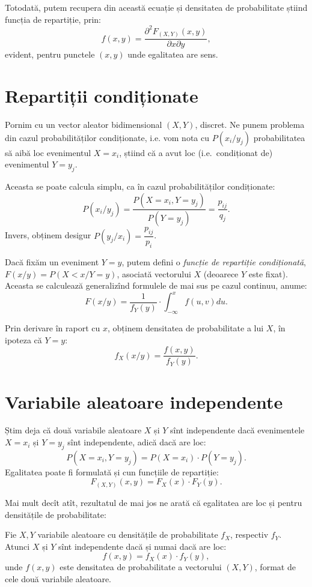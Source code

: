 Totodată, putem recupera din această ecuație și densitatea de probabilitate
știind funcția de repartiție, prin:
\[
  f(x, y) = \dfrac{\partial^2 F_{(X, Y)}(x, y)}{\partial x \partial y},
\]
evident, pentru punctele $ (x, y) $ unde egalitatea are sens.

\section{Repartiții condiționate}

Pornim cu un vector aleator bidimensional $ (X, Y) $, discret.
Ne punem problema din cazul probabilităților condiționate, i.e. vom nota
cu $ P(x_i/y_j) $ probabilitatea să aibă loc evenimentul $ X = x_i $,
știind că a avut loc (i.e.\ condiționat de) evenimentul $ Y = y_j $.

Aceasta se poate calcula simplu, ca în cazul probabilităților condiționate:
\[
  P(x_i / y_j) = \dfrac{P(X = x_i, Y = y_j)}{P(Y = y_j)} = \dfrac{p_{ij}}{q_j}.
\]
Invers, obținem desigur $ P(y_j / x_i) = \dfrac{p_{ij}}{p_i} $.

Dacă fixăm un eveniment $ Y = y $, putem defini o \emph{funcție de repartiție %
  condiționată}, $ F(x/y) = P(X < x / Y = y) $, asociată vectorului $ X $
(deoarece $ Y $ este fixat). Aceasta se calculează generalizînd formulele de
mai sus pe cazul continuu, anume:
\[
  F(x/y) = \dfrac{1}{f_Y(y)} \cdot \int_{-\infty}^x f(u, v) du.
\]

Prin derivare în raport cu $ x $, obținem densitatea de probabilitate a
lui $ X $, în ipoteza că $ Y = y $:
\[
  f_X(x/y) = \dfrac{f(x, y)}{f_Y(y)}.
\]

\section{Variabile aleatoare independente}

Știm deja că două variabile aleatoare $ X $ și $ Y $ sînt independente
dacă evenimentele $ X = x_i $ și $ Y = y_j $ sînt independente,
adică dacă are loc:
\[
  P(X = x_i, Y = y_j) = P(X = x_i) \cdot P(Y = y_j).
\]
Egalitatea poate fi formulată și cun funcțiile de repartiție:
\[
  F_{(X, Y)}(x, y) = F_X(x) \cdot F_Y(y).
\]

Mai mult decît atît, rezultatul de mai jos ne arată că egalitatea are
loc și pentru densitățile de probabilitate:

\begin{theorem}\label{thm:indep}
  Fie $ X, Y $ variabile aleatoare cu densitățile de probabilitate
  $ f_X $, respectiv $ f_Y $. Atunci $ X $ și $ Y $ sînt independente
  dacă și numai dacă are loc:
  \[
    f(x, y) = f_X(x) \cdot f_Y(y),
  \]
  unde $ f(x, y) $ este densitatea de probabilitate a vectorului $ (X, Y) $,
  format de cele două variabile aleatoare.
\end{theorem}

